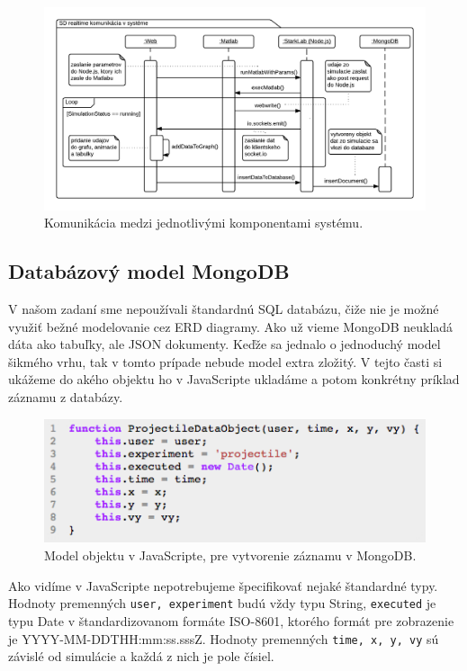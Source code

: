 \begin{figure}[H]
  \centering
  \includegraphics[scale=0.38]{img/diagrams/sequence-realtime-communication.png}
  \caption{Komunikácia medzi jednotlivými komponentami systému.}
  \label{img-sequence-realtime}
\end{figure}

\subsection{Databázový model MongoDB}
V našom zadaní sme nepoužívali štandardnú SQL databázu, čiže nie je možné využiť bežné modelovanie cez ERD diagramy. Ako už vieme MongoDB neukladá dáta ako tabuľky, ale JSON dokumenty. Keďže sa jednalo o jednoduchý model šikmého vrhu, tak v tomto prípade nebude model extra zložitý. V tejto časti si ukážeme do akého objektu ho v JavaScripte ukladáme a potom konkrétny príklad záznamu z databázy.

\begin{figure}[H]
  \centering
  \includegraphics[scale=0.8]{img/code/javascript-projectile-model.png}
  \caption{Model objektu v JavaScripte, pre vytvorenie záznamu v MongoDB.}
  \label{img-js-projectile-model}
\end{figure}

Ako vidíme v JavaScripte nepotrebujeme špecifikovať nejaké štandardné typy. Hodnoty premenných \verb|user, experiment| budú vždy typu String, \verb|executed| je typu Date v štandardizovanom formáte ISO-8601, ktorého formát pre zobrazenie je YYYY-MM-DDTHH:mm:ss.sssZ. Hodnoty premenných \verb|time, x, y, vy| sú závislé od simulácie a každá z nich je pole čísiel.

